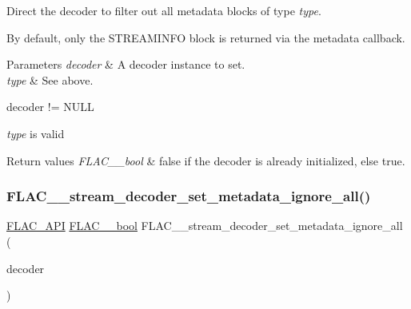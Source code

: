 Direct the decoder to filter out all metadata blocks of type {\itshape type}.

By default, only the {\ttfamily S\+T\+R\+E\+A\+M\+I\+N\+FO} block is returned via the metadata callback. 
\begin{DoxyParams}{Parameters}
{\em decoder} & A decoder instance to set. \\
\hline
{\em type} & See above.  
\begin{DoxyCode}
decoder != NULL 
\end{DoxyCode}
 {\itshape type} is valid \\
\hline
\end{DoxyParams}

\begin{DoxyRetVals}{Return values}
{\em F\+L\+A\+C\+\_\+\+\_\+bool} & {\ttfamily false} if the decoder is already initialized, else {\ttfamily true}. \\
\hline
\end{DoxyRetVals}
\mbox{\label{group__flac__stream__decoder_ga6e515420f5b2a5422cd333b3d4c21064}} 
\subsubsection{\texorpdfstring{F\+L\+A\+C\+\_\+\+\_\+stream\+\_\+decoder\+\_\+set\+\_\+metadata\+\_\+ignore\+\_\+all()}{FLAC\_\_stream\_decoder\_set\_metadata\_ignore\_all()}}
{\footnotesize\ttfamily \hyperlink{group__flac__export_ga56ca07df8a23310707732b1c0007d6f5}{F\+L\+A\+C\+\_\+\+A\+PI} \hyperlink{ordinals_8h_a95103469f1cbd78b8cf250194985b34e}{F\+L\+A\+C\+\_\+\+\_\+bool} F\+L\+A\+C\+\_\+\+\_\+stream\+\_\+decoder\+\_\+set\+\_\+metadata\+\_\+ignore\+\_\+all (\begin{DoxyParamCaption}\item[{\hyperlink{struct_f_l_a_c_____stream_decoder}{F\+L\+A\+C\+\_\+\+\_\+\+Stream\+Decoder} $\ast$}]{decoder }\end{DoxyParamCaption})}

